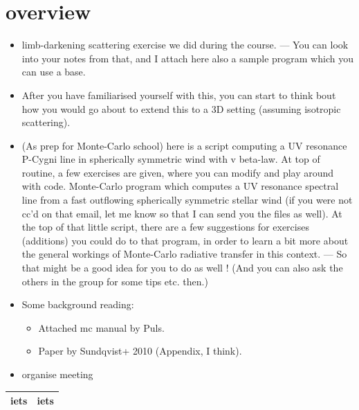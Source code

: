 \documentclass[10pt,a4paper]{article}
\begin{document}
\section{overview}

\begin{itemize}
\item limb-darkening scattering exercise we did during the course. 
— You can look into your notes from that, and I attach here also a sample program which you can use a base. 

\item After you have familiarised yourself with this, you can start to think bout how you would go about to extend this to a 3D setting (assuming isotropic scattering). 

\item (As prep for Monte-Carlo school) here is a script computing a UV resonance P-Cygni line in spherically symmetric wind with v beta-law. At top of routine, a few exercises are given, where you can modify and play around with code. Monte-Carlo program which computes a UV resonance spectral line from a fast outflowing spherically symmetric stellar wind (if you were not cc’d on that email, let me know so that I can send you the files as well). At the top of that little script, there are a few suggestions for exercises (additions) you could do to that program, in order to learn a bit more about the general workings of Monte-Carlo radiative transfer in this context.  
— So that might be a good idea for you to do as well !   (And you can also ask the others in the group for some tips etc. then.) 

\item Some background reading: 
\begin{itemize}
\item Attached mc manual by Puls. 
\item Paper by Sundqvist+ 2010 (Appendix, I think). 
\end{itemize}

\item organise meeting

\end{itemize}


\begin{center}
\centering
{\tabulinesep=1.5mm
\begin{tabu}{|c|c|}
\hline 
iets & iets \\ \hline
\end{tabu}}
\end{center}
\end{document}
